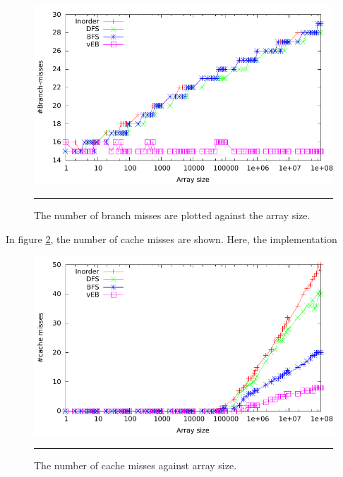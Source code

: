 \begin{figure}[htbp]
	\centering
		\includegraphics[width=\textwidth]{./Figures/Project1/Branch_misses.pdf}
		\rule{35em}{0.5pt}
	\caption[Branch misses]{
	The number of branch misses are plotted against the array size.
	}
	\label{fig:Branch_misses_p1}
\end{figure}


In figure \ref{fig:Cache_misses_p1}, the number of cache misses are shown. Here, the implementation

\begin{figure}[htbp]
	\centering
		\includegraphics[width=\textwidth]{./Figures/Project1/Cache_misses.pdf}
		\rule{35em}{0.5pt}
	\caption[Cache misses]{
	The number of cache misses against array size.
	}
	\label{fig:Cache_misses_p1}
\end{figure}

